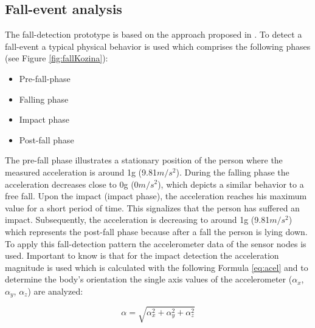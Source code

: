 \documentclass[review]{elsarticle}
\begin{document}
\subsection{Fall-event analysis}
\label{subsec:fall-analysis}
The fall-detection prototype is based on the approach proposed in \cite{Gjoreski2014, Kozina}. To detect a fall-event a typical physical behavior is used which comprises the following phases (see Figure \ref{fig:fallKozina}):
\begin{itemize}
	\item Pre-fall-phase 
	\item Falling phase
	\item Impact phase
	\item Post-fall phase
\end{itemize}
The pre-fall phase illustrates a stationary position of the person where the measured acceleration is around 1g (9.81$m/s^{2}$). During the falling phase the  acceleration decreases close to 0g (0$m/s^{2}$), which depicts a similar behavior to a free fall. Upon the impact (impact phase), the acceleration reaches his maximum value for a short period of time. This signalizes that the person has suffered an impact. Subsequently, the acceleration is decreasing to around 1g (9.81$m/s^{2}$) which represents the post-fall phase because after a fall the person is lying down. To apply this fall-detection pattern the accelerometer data of the sensor nodes is used. Important to know is that for the impact detection the acceleration magnitude is used which is calculated with the following Formula \ref{eq:acel} and to determine the body's orientation the single axis values of the accelerometer ($\alpha_x$, $\alpha_y$, $\alpha_z$) are analyzed:

\begin{equation}\label{eq:acel}
\alpha = \sqrt{\alpha_{x}^{2} + \alpha_{y}^{2} + \alpha_{z}^{2}}
\end{equation}
\end{document}
